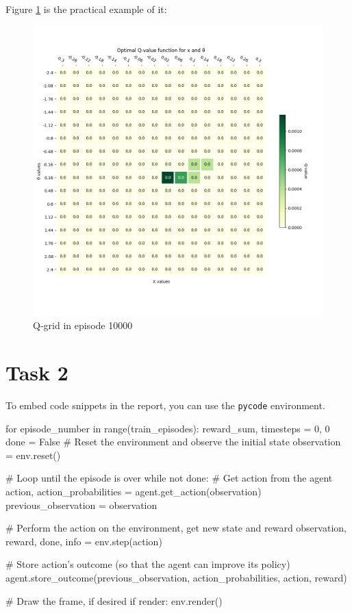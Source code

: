 \documentclass[12pt]{article}
\begin{document}
Figure \ref{fig:q-1-3} is the practical example of it:

\begin{figure}[h]
    \centering
    \includegraphics[scale=0.25]{exercise-3/plots/heatmap-fixed-0.2-ep-1.png}
    \caption{Q-grid in episode 10000}
    \label{fig:q-1-3}
\end{figure}

\subsection{}

\section{Task 2}
To embed code snippets in the report, you can use the \texttt{pycode} environment.

\begin{pycode}
for episode_number in range(train_episodes):
    reward_sum, timesteps = 0, 0
    done = False
    # Reset the environment and observe the initial state
    observation = env.reset()

    # Loop until the episode is over
    while not done:
        # Get action from the agent
        action, action_probabilities = agent.get_action(observation)
        previous_observation = observation

        # Perform the action on the environment, get new state and reward
        observation, reward, done, info = env.step(action)

        # Store action's outcome (so that the agent can improve its policy)
        agent.store_outcome(previous_observation, action_probabilities, action, reward)

        # Draw the frame, if desired
        if render:
            env.render()
\end{pycode}
\end{document}
